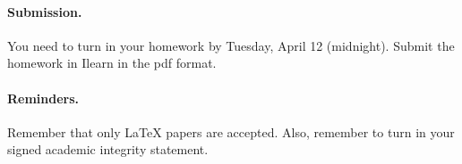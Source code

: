 \documentclass{article}
\begin{document}

\vskip 0.1in
\paragraph{Submission.}
You need to turn in your homework by Tuesday, April 12 (midnight).
Submit the homework in Ilearn in the pdf format.

\paragraph{Reminders.}
Remember that only {\LaTeX} papers are accepted. Also,
remember to turn in your signed academic integrity statement.
\end{document}
